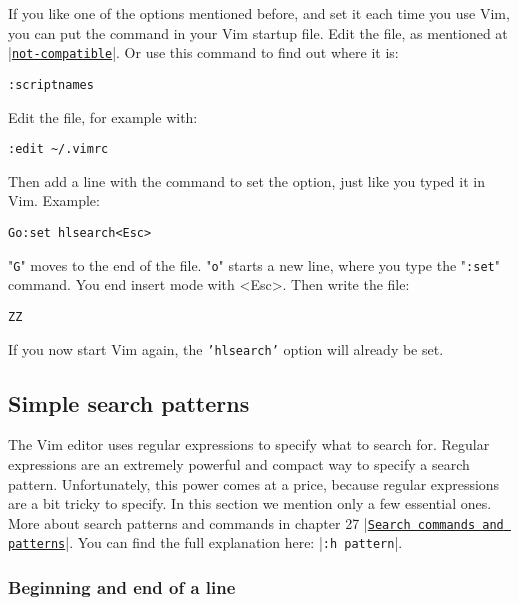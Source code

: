 If you like one of the options mentioned before, and set it each time you use Vim, you can put the command in your Vim startup file.
Edit the file, as mentioned at \hyperref[not-compatible]{|\texttt{not-compatible}|}.
Or use this command to find out where it is:

 \begin{Verbatim}[samepage=true]
 :scriptnames
 \end{Verbatim}

Edit the file, for example with:

 \begin{Verbatim}[samepage=true]
 :edit ~/.vimrc
 \end{Verbatim}

Then add a line with the command to set the option, just like you typed it in Vim.
Example:

 \begin{Verbatim}[samepage=true]
 Go:set hlsearch<Esc>
 \end{Verbatim}

"\texttt{G}" moves to the end of the file.
"\texttt{o}" starts a new line, where you type the "\texttt{:set}" command.
You end insert mode with <Esc>.
Then write the file:

 \begin{Verbatim}[samepage=true]
 ZZ
 \end{Verbatim}

If you now start Vim again, the \texttt{'hlsearch'} option will already be set.

\subsection{Simple search patterns}
\label{Simple search patterns}

The Vim editor uses regular expressions to specify what to search for.
Regular expressions are an extremely powerful and compact way to specify a search pattern.
Unfortunately, this power comes at a price, because regular expressions are a bit tricky to specify.
In this section we mention only a few essential ones.
More about search patterns and commands in chapter 27 |\hyperref[Search commands and patterns]{\texttt{Search commands and patterns}}|.
You can find the full explanation here: |\texttt{:h pattern}|.

\subsubsection{Beginning and end of a line}

